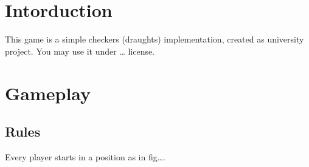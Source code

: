 \documentclass[a5paper]{article}
\begin{document}
\section{Intorduction}

This game is a simple checkers (draughts) implementation, created as university project. You may use it under \dots {} license.

\section{Gameplay}

\subsection{Rules}

Every player starts in a position as in fig\dots.
\end{document}
